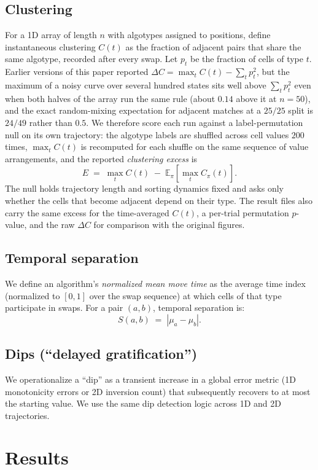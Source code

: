 \documentclass[11pt]{article}
\begin{document}
\subsection{Clustering}
For a 1D array of length $n$ with algotypes assigned to positions, define instantaneous clustering
$C(t)$ as the fraction of adjacent pairs that share the same algotype, recorded after every swap.
Let $p_t$ be the fraction of cells of type $t$. Earlier versions of this paper reported
$\Delta C = \max_t C(t) - \sum_t p_t^2$, but the maximum of a noisy curve over several hundred
states sits well above $\sum_t p_t^2$ even when both halves of the array run the same rule (about
$0.14$ above it at $n=50$), and the exact random-mixing expectation for adjacent matches at a
$25/25$ split is $24/49$ rather than $0.5$. We therefore score each run against a label-permutation
null on its own trajectory: the algotype labels are shuffled across cell values $200$ times,
$\max_t C(t)$ is recomputed for each shuffle on the same sequence of value arrangements, and the
reported \emph{clustering excess} is
\[
E \;=\; \max_t C(t) \;-\; \mathbb{E}_{\pi}\!\left[\max_t C_{\pi}(t)\right].
\]
The null holds trajectory length and sorting dynamics fixed and asks only whether the cells that
become adjacent depend on their type. The result files also carry the same excess for the
time-averaged $C(t)$, a per-trial permutation $p$-value, and the raw $\Delta C$ for comparison with
the original figures.

\subsection{Temporal separation}
We define an algorithm's \emph{normalized mean move time} as the average time index (normalized to
$[0,1]$ over the swap sequence) at which cells of that type participate in swaps. For a pair
$(a,b)$, temporal separation is:
\[
S(a,b) \;=\; \left|\mu_a - \mu_b\right|.
\]

\subsection{Dips (``delayed gratification'')}
We operationalize a ``dip'' as a transient increase in a global error metric (1D monotonicity errors
or 2D inversion count) that subsequently recovers to at most the starting value. We use the same dip
detection logic across 1D and 2D trajectories.

\section{Results}
\label{sec:results}
\end{document}
